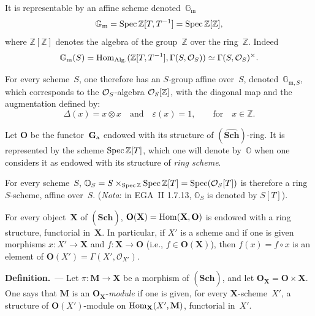It is representable by an affine scheme denoted~\(\mathbb{G}_{\mathrm{m}}\)
\[
\mathbb{G}_{\mathrm{m}} = \operatorname{Spec} \mathbb{Z}[T, T^{-1}] = \operatorname{Spec} \mathbb{Z}[\mathbb{Z}],
\]
where \(\mathbb{Z}[\mathbb{Z}]\) denotes the algebra of the group~\(\mathbb{Z}\) over the ring~\(\mathbb{Z}\). Indeed
\[
\mathbb{G}_{\mathrm{m}}(S) = \operatorname{Hom}_{\mathrm{Alg.}}(\mathbb{Z}[T, T^{-1}], \Gamma(S, \mathcal{O}_S)) \simeq \Gamma(S, \mathcal{O}_S)^{\times}.
\]

For every scheme~\(S\), one therefore has an \(S\)-group affine over~\(S\), denoted~\(\mathbb{G}_{\mathrm{m},S}\), which corresponds to the \(\mathcal{O}_S\)-algebra \(\mathcal{O}_S[\mathbb{Z}]\), with the diagonal map and the augmentation defined by:
\[
\Delta(x) = x \otimes x \quad\text{and}\quad \varepsilon(x) = 1, \qquad\text{for}\quad x \in \mathbb{Z}.
\]

Let \(\mathbf{O}\) be the functor~\(\mathbf{G}_{\mathrm{a}}\) endowed with its structure of \((\widehat{\mathbf{Sch}})\)-ring. It is represented by the scheme \(\operatorname{Spec} \mathbb{Z}[T]\), which one will denote by~\(\mathbb{O}\) when one considers it as endowed with its structure of \emph{ring scheme}.

For every scheme~\(S\), \(\mathbb{O}_S = S \times_{\operatorname{Spec} \mathbb{Z}} \operatorname{Spec} \mathbb{Z}[T] = \operatorname{Spec}(\mathcal{O}_S[T])\) is therefore a ring \(S\)-scheme, affine over~\(S\). (\emph{Nota}: in EGA~II 1.7.13, \(\mathbb{O}_S\) is denoted by \(S[T]\)).

{\renewcommand{\thefootnote}{(30)}}
For every object~\(\mathbf{X}\) of \((\widehat{\mathbf{Sch}})\), \(\mathbf{O}(\mathbf{X}) = \operatorname{Hom}(\mathbf{X}, \mathbf{O})\) is endowed with a ring structure, functorial in~\(\mathbf{X}\). In particular, if \(X'\) is a scheme and if one is given morphisms \(x \colon X' \to \mathbf{X}\) and \(f \colon \mathbf{X} \to \mathbf{O}\) (i.e., \(f \in \mathbf{O}(\mathbf{X})\)), then \(f(x) = f \circ x\) is an element of \(\mathbf{O}(X') = \Gamma(X', \mathcal{O}_{X'})\).

\par{}
\noindent\textbf{Definition.}\ ---
Let \(\pi \colon \mathbf{M} \to \mathbf{X}\) be a morphism of \((\widehat{\mathbf{Sch}})\), and let \(\mathbf{O}_{\mathbf{X}} = \mathbf{O} \times \mathbf{X}\). One says that \(\mathbf{M}\) is an \(\mathbf{O}_{\mathbf{X}}\)-\emph{module} if one is given, for every \(\mathbf{X}\)-scheme~\(X'\), a structure of \(\mathbf{O}(X')\)-module on \(\operatorname{Hom}_{\mathbf{X}}(X', \mathbf{M})\), functorial in~\(X'\).

